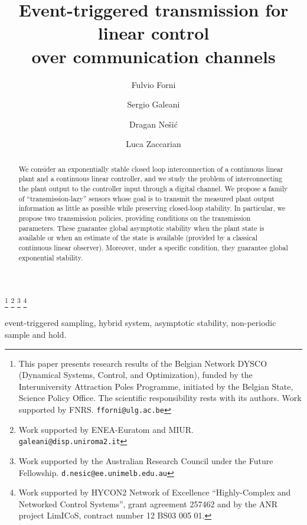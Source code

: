 \documentclass[twocolumn]{autart}
\begin{document}
\begin{frontmatter}
\title{{ Event-triggered transmission for linear control \\ over communication channels }}


\author[liegea]{Fulvio Forni}
\author[romaa]{Sergio Galeani}
\author[melba]{Dragan Ne\v{s}i\'{c}}
\author[laas,trento]{Luca Zaccarian}

\address[liegea]{Department of Electrical Engineering and Computer Science,
Universit\'e de Li{\`e}ge, 4000 Li{\`e}ge, Belgium.\-.6cm]}
\address[melba]{EEE Department, University of Melbourne, Australia.\-.6cm]}        
\address[trento]{Dipartimento di Ingegneria Industriale, University of
  Trento, Italy}        
\thanks[liege]{This paper presents research results of the Belgian Network DYSCO
(Dynamical Systems, Control, and Optimization), funded by the
Interuniversity Attraction Poles Programme, initiated by the Belgian
State, Science Policy Office. The scientific responsibility rests with
its authors. Work supported by FNRS. {\tt fforni@ulg.ac.be}}                  
\thanks[roma]{Work supported by ENEA-Euratom and MIUR. {\tt galeani@disp.uniroma2.it}}
\thanks[melb]{Work supported by the Australian Research Council under the Future Fellowship. {\tt d.nesic@ee.unimelb.edu.au}} 
\thanks[laas_trento]{Work supported by HYCON2 Network of Excellence ``Highly-Complex
and Networked Control Systems'', grant agreement 257462 and by the ANR project LimICoS, contract number 12 BS03 005 01.} 

\begin{abstract}
We consider an exponentially stable closed loop interconnection of a continuous linear plant 
and a continuous linear controller, and we study the problem of interconnecting the plant 
output to the controller input through a { digital channel.}
We propose a family of ``transmission-lazy'' sensors 
whose goal is to transmit the measured plant output information as little as possible 
while preserving closed-loop stability. In particular, we propose two transmission 
policies, providing conditions on the transmission parameters. 
These guarantee global asymptotic stability when the plant state is available or
when an estimate of the state is available (provided by a classical 
continuous linear observer). Moreover, under a specific condition, 
they guarantee global exponential stability. \vspace{-5mm}
\end{abstract}

\begin{keyword}
{ event-triggered sampling}, hybrid system, asymptotic stability, non-periodic sample and hold.
\end{keyword}
\end{frontmatter}
\end{document}
